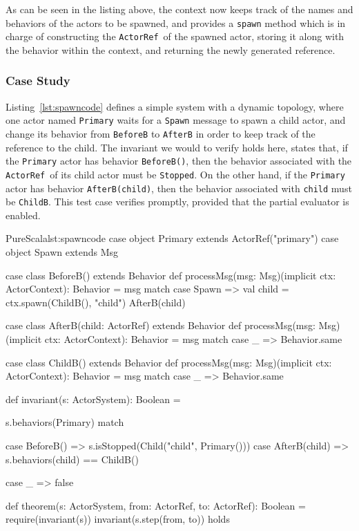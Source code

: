 \documentclass[a4paper,twoside]{article}
\newcommand{\InlineS}[1]{\lstinline[language=PureScala,basicstyle=\small\ttfamily,columns=fixed]|#1|}
\newcommand{\RefCode}[1]{Listing~\ref{#1}}
\newcommand{\ActorRef}{\InlineS{ActorRef}\ }
\newcommand{\stt}[1]{\texttt{\small{#1}}}
\begin{document}
As can be seen in the listing above, the context now keeps track of the names and 
behaviors of the actors to be spawned, and provides a \stt{spawn} method which is in  charge of constructing the \ActorRef of the spawned actor, storing it along with the  behavior within the context, and returning the newly generated reference.

\subsubsection{Case Study}

\RefCode{lst:spawncode} defines a simple system with a dynamic topology, where one actor named \stt{Primary} waits for a \stt{Spawn} message to spawn a child actor, and change its behavior from \stt{BeforeB} to \stt{AfterB} in order to keep track of the reference to the child. The invariant we would to verify holds here, states that, if the \stt{Primary} actor has behavior \stt{BeforeB()}, then the behavior associated with the \ActorRef of its child actor must be \stt{Stopped}. On the other hand, if the \stt{Primary} actor has behavior \stt{AfterB(child)}, then the behavior associated with \stt{child} must be \stt{ChildB}. This test case verifies promptly, provided that the partial evaluator is enabled.

\begin{Code}{PureScala}{lst:spawncode}{}
case object Primary extends ActorRef("primary")
case object Spawn extends Msg

case class BeforeB() extends Behavior {
  def processMsg(msg: Msg)(implicit ctx: ActorContext): Behavior = msg match {
    case Spawn =>
      val child = ctx.spawn(ChildB(), "child")
      AfterB(child)
  }
}

case class AfterB(child: ActorRef) extends Behavior {
  def processMsg(msg: Msg)(implicit ctx: ActorContext): Behavior = msg match {
    case _ => Behavior.same
  }
}

case class ChildB() extends Behavior {
  def processMsg(msg: Msg)(implicit ctx: ActorContext): Behavior = msg match {
    case _ => Behavior.same
  }
}

def invariant(s: ActorSystem): Boolean = {
  s.behaviors(Primary) match {
    case BeforeB() =>
      s.isStopped(Child("child", Primary()))
    case AfterB(child) =>
      s.behaviors(child) == ChildB()

    case _ => false
  }
}

def theorem(s: ActorSystem, from: ActorRef, to: ActorRef): Boolean = {
  require(invariant(s))
  invariant(s.step(from, to))
} holds
\end{Code}
\end{document}
